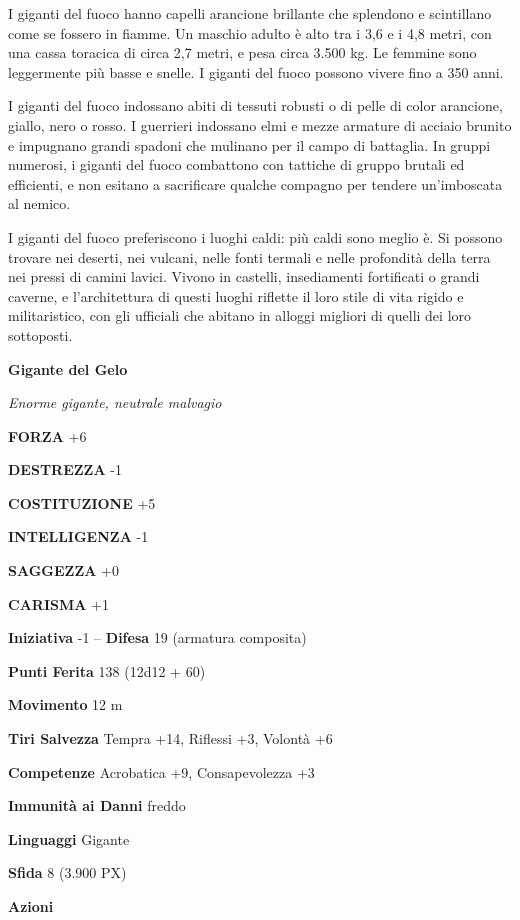 \begin{multicols}{2}
I giganti del fuoco hanno capelli arancione brillante che splendono e scintillano come se fossero in fiamme. Un maschio adulto è alto tra i 3,6 e i 4,8 metri, con una cassa toracica di circa 2,7 metri, e pesa circa 3.500 kg. Le femmine sono leggermente più basse e snelle. I giganti del fuoco possono vivere fino a 350 anni.

I giganti del fuoco indossano abiti di tessuti robusti o di pelle di color arancione, giallo, nero o rosso. I guerrieri indossano elmi e mezze armature di acciaio brunito e impugnano grandi spadoni che mulinano per il campo di battaglia. In gruppi numerosi, i giganti del fuoco combattono con tattiche di gruppo brutali ed efficienti, e non esitano a sacrificare qualche compagno per tendere un'imboscata al nemico.

I giganti del fuoco preferiscono i luoghi caldi: più caldi sono meglio è. Si possono trovare nei deserti, nei vulcani, nelle fonti termali e nelle profondità della terra nei pressi di camini lavici. Vivono in castelli, insediamenti fortificati o grandi caverne, e l'architettura di questi luoghi riflette il loro stile di vita rigido e militaristico, con gli ufficiali che abitano in alloggi migliori di quelli dei loro sottoposti.



\medskip{}\textbf{Gigante del Gelo}

\textit{Enorme gigante, neutrale malvagio}

\textbf{FORZA} +6

\textbf{DESTREZZA} -1

\textbf{COSTITUZIONE} +5

\textbf{INTELLIGENZA} -1

\textbf{SAGGEZZA} +0

\textbf{CARISMA} +1

\textbf{Iniziativa} -1 -- \textbf{Difesa} 19 (armatura composita)

\textbf{Punti Ferita} 138 (12d12 + 60)

\textbf{Movimento} 12 m

\textbf{Tiri Salvezza} Tempra +14, Riflessi +3, Volontà +6

\textbf{Competenze} Acrobatica +9, Consapevolezza +3

\textbf{Immunità ai Danni} freddo

\textbf{Linguaggi} Gigante

\textbf{Sfida} 8 (3.900 PX)

\textbf{Azioni}


\end{multicols}
